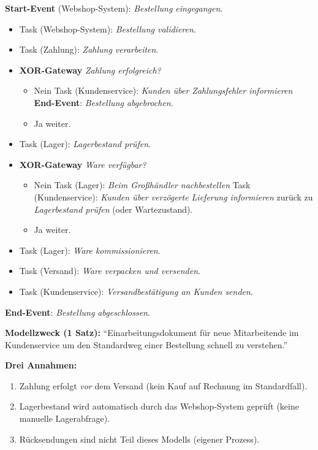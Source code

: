 \documentclass[11pt,a4paper,oneside]{article}
\begin{document}
\begin{loesungbox}
\smallskip
\textbf{Start-Event} (Webshop-System): \emph{Bestellung eingegangen}.
\begin{itemize}
  \item Task (Webshop-System): \emph{Bestellung validieren}.
  \item Task (Zahlung): \emph{Zahlung verarbeiten}.
  \item \textbf{XOR-Gateway} \emph{Zahlung erfolgreich?}
  \begin{itemize}
    \item Nein \textrightarrow{} Task (Kundenservice): \emph{Kunden \"uber Zahlungsfehler informieren} \textrightarrow{} \textbf{End-Event}: \emph{Bestellung abgebrochen}.
    \item Ja \textrightarrow{} weiter.
  \end{itemize}
  \item Task (Lager): \emph{Lagerbestand pr\"ufen}.
  \item \textbf{XOR-Gateway} \emph{Ware verf\"ugbar?}
  \begin{itemize}
    \item Nein \textrightarrow{} Task (Lager): \emph{Beim Gro{\ss}h\"andler nachbestellen} \textrightarrow{} Task (Kundenservice): \emph{Kunden \"uber verz\"ogerte Lieferung informieren} \textrightarrow{} zur\"uck zu \emph{Lagerbestand pr\"ufen} (oder Wartezustand).
    \item Ja \textrightarrow{} weiter.
  \end{itemize}
  \item Task (Lager): \emph{Ware kommissionieren}.
  \item Task (Versand): \emph{Ware verpacken und versenden}.
  \item Task (Kundenservice): \emph{Versandbest\"atigung an Kunden senden}.
\end{itemize}
\textbf{End-Event}: \emph{Bestellung abgeschlossen}.

\smallskip
\textbf{Modellzweck (1 Satz):} ``Einarbeitungsdokument f\"ur neue Mitarbeitende im Kundenservice \textendash{} um den Standardweg einer Bestellung schnell zu verstehen.''

\smallskip
\textbf{Drei Annahmen:}
\begin{enumerate}
  \item Zahlung erfolgt \emph{vor} dem Versand (kein Kauf auf Rechnung im Standardfall).
  \item Lagerbestand wird automatisch durch das Webshop-System gepr\"uft (keine manuelle Lagerabfrage).
  \item R\"ucksendungen sind nicht Teil dieses Modells (eigener Prozess).
\end{enumerate}


\end{loesungbox}
\end{document}
